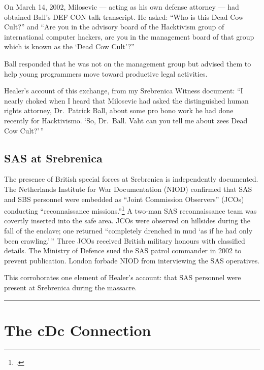 On March 14, 2002, Milosevic --- acting as his own defense attorney --- had obtained Ball's DEF CON talk transcript. He asked: ``Who is this Dead Cow Cult?'' and ``Are you in the advisory board of the Hacktivism group of international computer hackers, are you in the management board of that group which is known as the `Dead Cow Cult'?''

Ball responded that he was not on the management group but advised them to help young programmers move toward productive legal activities.

Healer's account of this exchange, from my Srebrenica Witness document: ``I nearly choked when I heard that Milosevic had asked the distinguished human rights attorney, Dr.\ Patrick Ball, about some pro bono work he had done recently for Hacktivismo. `So, Dr.\ Ball. Vaht can you tell me about zees Dead Cow Cult?'\,''

\subsection*{SAS at Srebrenica}
\label{pos19:sas-srebrenica}

The presence of British special forces at Srebrenica is independently documented. The Netherlands Institute for War Documentation (NIOD) confirmed that SAS and SBS personnel were embedded as ``Joint Commission Observers'' (JCOs) conducting ``reconnaissance missions.''\footcite{niod2002} A two-man SAS reconnaissance team was covertly inserted into the safe area. JCOs were observed on hillsides during the fall of the enclave; one returned ``completely drenched in mud `as if he had only been crawling.'\,'' Three JCOs received British military honours with classified details. The Ministry of Defence sued the SAS patrol commander in 2002 to prevent publication. London forbade NIOD from interviewing the SAS operatives.

This corroborates one element of Healer's account: that SAS personnel were present at Srebrenica during the massacre.


\vspace{1cm}\noindent\rule{0.5\textwidth}{0.5pt}\vspace{0.5cm}

\section*{The cDc Connection}
\label{pos19:cdc-connection}


